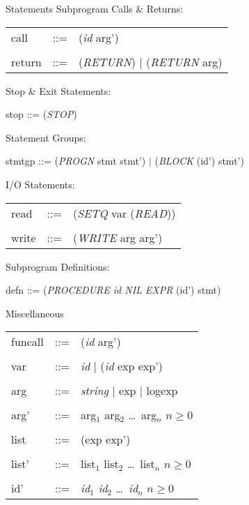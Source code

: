 \begin{describe}{Statements}
Subprogram Calls \& Returns:

\begin{tabular}{lll}
call & ::= & ({\it id\/} arg')\\
& &\\
return & ::= & ({\it RETURN\/})  $\mid$  ({\it RETURN\/} arg)\\
\end{tabular}

Stop \& Exit Statements:

stop ::= ({\it STOP\/})

Statement Groups:

stmtgp  ::=  ({\it PROGN\/} stmt stmt')  $\mid$  ({\it BLOCK\/} (id') stmt')

I/O Statements:

\begin{tabular}{lll}
read & ::= & ({\it SETQ\/} var ({\it READ\/}))\\
& &\\
write & ::= & ({\it WRITE\/} arg arg')\\
\end{tabular}

Subprogram Definitions:

defn  ::=  ({\it PROCEDURE id NIL EXPR\/} (id') stmt)

\end{describe}

\begin{describe}{Miscellaneous}
\begin{tabular}{lll}
funcall & ::= & ({\it id\/} arg')\\
& &\\
var & ::= & {\it id\/} $\mid$  ({\it id\/} exp exp')\\
& &\\
arg & ::= & {\it string\/} $\mid$  exp  $\mid$  logexp\\
& &\\
arg' & ::= & arg$_1$ arg$_2$ \dots\  arg$_n$  $n \geq 0$ \\
& &\\
list & ::= & (exp exp')\\
& &\\
list' & ::= & list$_1$ list$_2$ \dots\  list$_n$   $n \geq 0$ \\
& &\\
id' &  ::= & {\it id$_1$ id$_2$} \dots\ {\it id$_n$}  $n \geq 0$ \\
\end{tabular}
\end{describe}

